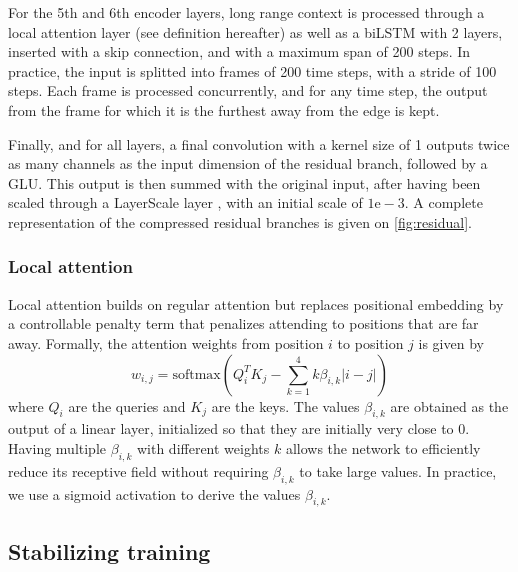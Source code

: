 \documentclass[10pt,a4paper,onecolumn]{article}
\let\origfigure\figure
\let\endorigfigure\endfigure
\renewenvironment{figure}[1][2] {
    \expandafter\origfigure\expandafter[H]
} {
    \endorigfigure
}
\begin{document}
For the 5th and 6th encoder layers, long range context is processed
through a local attention layer (see definition hereafter) as well as a
biLSTM with 2 layers, inserted with a skip connection, and with a
maximum span of 200 steps. In practice, the input is splitted into
frames of 200 time steps, with a stride of 100 steps. Each frame is
processed concurrently, and for any time step, the output from the frame
for which it is the furthest away from the edge is kept.

Finally, and for all layers, a final convolution with a kernel size of 1
outputs twice as many channels as the input dimension of the residual
branch, followed by a GLU. This output is then summed with the original
input, after having been scaled through a LayerScale layer
\citep{layerscale}, with an initial scale of \(1\mathrm{e}{-}3\). A
complete representation of the compressed residual branches is given on
\ref{fig:residual}.

\hypertarget{local-attention}{%
\subsubsection{Local attention}\label{local-attention}}

Local attention builds on regular attention \citep{attention} but
replaces positional embedding by a controllable penalty term that
penalizes attending to positions that are far away. Formally, the
attention weights from position \(i\) to position \(j\) is given by \[
w_{i, j} = \mathrm{softmax}(Q_i^T K_j - \sum_{k=1}^4 k \beta_{i, k} |i -j|) \]
where \(Q_i\) are the queries and \(K_j\) are the keys. The values
\(\beta_{i, k}\) are obtained as the output of a linear layer,
initialized so that they are initially very close to 0. Having multiple
\(\beta_{i, k}\) with different weights \(k\) allows the network to
efficiently reduce its receptive field without requiring
\(\beta_{i, k}\) to take large values. In practice, we use a sigmoid
activation to derive the values \(\beta_{i, k}\).

\begin{figure}
\hypertarget{fig:residual}{%
\centering
\resizebox{\textwidth}{!}{
  
}
\caption{Representation of the compressed residual branches that are
added to each encoder layer. For the 5th and 6th layer, a BiLSTM and a
local attention layer are added.}\label{fig:residual}
}
\end{figure}

\hypertarget{stabilizing-training}{%
\subsection{Stabilizing training}\label{stabilizing-training}}
\end{document}
